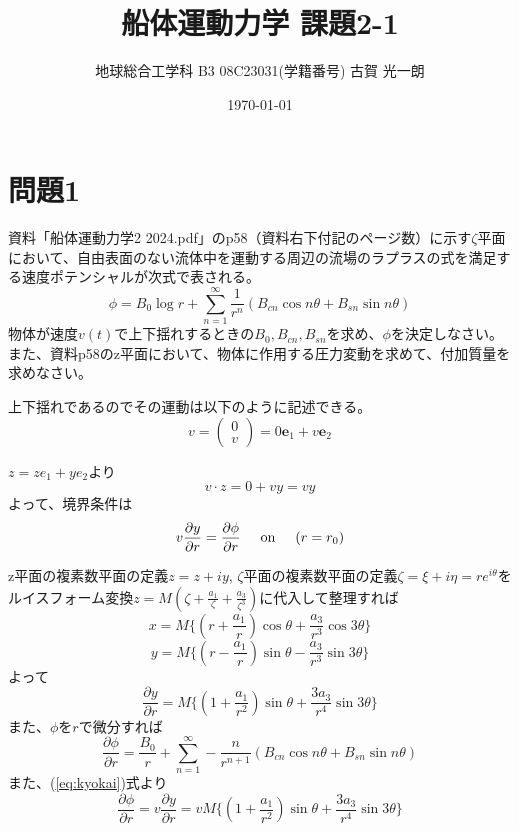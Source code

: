 \documentclass[11pt, dvipdfmx]{jsarticle}
\title{船体運動力学 課題2-1}
\author{地球総合工学科 \quad B3 \quad 08C23031(学籍番号) \quad 古賀 光一朗}
\date{\today}
\begin{document}
\maketitle

\section{問題1}
資料「船体運動力学2 2024.pdf」のp58（資料右下付記のページ数）に示す$\zeta$平面において、自由表面のない流体中を運動する周辺の流場のラプラスの式を満足する速度ポテンシャルが次式で表される。
\begin{equation}
    \phi = B_0 \log r + \sum_{n=1}^\infty \frac{1}{r^n}(B_{cn}\cos n\theta + B_{sn}\sin n\theta)
\end{equation}
物体が速度$v(t)$で上下揺れするときの$B_0, B_{cn}, B_{sn}$を求め、$\phi$を決定しなさい。また、資料p58のz平面において、物体に作用する圧力変動を求めて、付加質量を求めなさい。
\vspace{1cm}


上下揺れであるのでその運動は以下のように記述できる。
$$
v=
\begin{pmatrix}
    0\\ v
\end{pmatrix}
= 0 \boldsymbol{e}_1 + v \boldsymbol{e}_2
$$

$z=ze_1+ye_2$より
$$v \cdot z = 0+ vy = vy$$
よって、境界条件は
\begin{equation}
    v\frac{\partial y}{\partial r} = \frac{\partial \phi}{\partial r}\hspace{5mm}\text{on}\hspace{5mm}(r=r_0)
    \label{eq:kyokai}
\end{equation}

z平面の複素数平面の定義$z=z+iy$, $\zeta$平面の複素数平面の定義$\zeta = \xi + i\eta = re^{i\theta}$をルイスフォーム変換$z= M(\zeta+\frac{a_1}{\zeta}+\frac{a_3}{\zeta^3})$に代入して整理すれば
$$
x=M \{ ( r+\frac{a_1}{r})\cos \theta +\frac{a_3}{r^3}\cos3\theta \}
$$
$$
y=M \{ ( r-\frac{a_1}{r})\sin \theta -\frac{a_3}{r^3}\sin 3\theta \}
$$
よって
$$
\frac{\partial y}{\partial r} = M \{ (1+\frac{a_1}{r^2})\sin \theta +\frac{3a_3}{r^4}\sin 3\theta \}
$$
また、$\phi$を$r$で微分すれば
\begin{equation}
    \frac{\partial \phi}{\partial r} = \frac{B_0}{r} + \sum_{n=1}^\infty -\frac{n}{r^{n+1}}(B_{cn}\cos n\theta + B_{sn}\sin n\theta)
    \label{eq:phi1}
\end{equation}
また、(\ref{eq:kyokai})式より
\begin{equation}
    \frac{\partial \phi}{\partial r} = v\frac{\partial y}{\partial r} = vM \{ (1+\frac{a_1}{r^2})\sin \theta +\frac{3a_3}{r^4}\sin 3\theta \}
    \label{eq:phi2} 
\end{equation}
\end{document}
